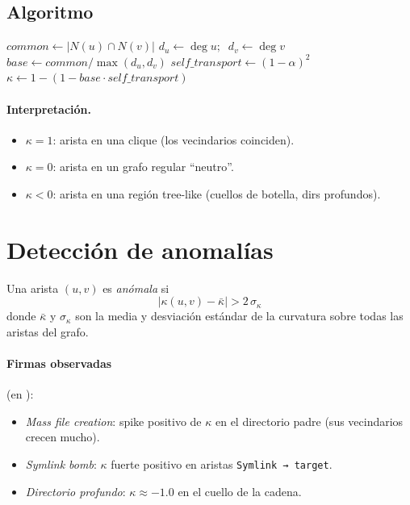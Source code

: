 \subsection*{Algoritmo}

\begin{algorithm}[H]
\SetAlgoLined
{}
\caption{\textsc{OllivierRicciLLY}}\label{alg:curvatura}

$\mathit{common} \gets |N(u) \cap N(v)|$\;
$\mathit{d}_u \gets \deg u; \;\; \mathit{d}_v \gets \deg v$\;
$\mathit{base} \gets \mathit{common} / \max(\mathit{d}_u, \mathit{d}_v)$\;
$\mathit{self\_transport} \gets (1 - \alpha)^2$\;
$\kappa \gets 1 - (1 - \mathit{base} \cdot \mathit{self\_transport})$\;
\Return{$\kappa$}\;
\end{algorithm}

\paragraph{Interpretación.}

\begin{itemize}
  \item $\kappa = 1$: arista en una clique (los vecindarios coinciden).
  \item $\kappa = 0$: arista en un grafo regular ``neutro''.
  \item $\kappa < 0$: arista en una región tree-like (cuellos de
    botella, dirs profundos).
\end{itemize}

\section{Detección de anomalías}

\begin{defn}
\label{def:anomalia}
Una arista $(u, v)$ es \emph{anómala} si
\[
  |\kappa(u, v) - \bar{\kappa}| > 2\,\sigma_{\kappa}
\]
donde $\bar{\kappa}$ y $\sigma_{\kappa}$ son la media y desviación
estándar de la curvatura sobre todas las aristas del grafo.
\end{defn}

\paragraph{Firmas observadas} (en
):

\begin{itemize}
  \item \emph{Mass file creation}: spike positivo de $\kappa$ en el
    directorio padre (sus vecindarios crecen mucho).
  \item \emph{Symlink bomb}: $\kappa$ fuerte positivo en aristas
    \texttt{Symlink → target}.
  \item \emph{Directorio profundo}: $\kappa \approx -1.0$ en el cuello
    de la cadena.
\end{itemize}

